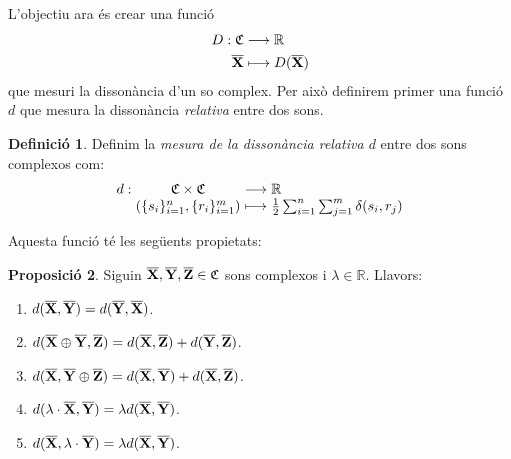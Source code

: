 \documentclass{article}
\theoremstyle{definition}
\newtheorem{definition}{Definició}[section]
\newtheorem{prop}[definition]{Proposició}
\newcommand{\0}{\ensuremath{\vb{0}}}
\newcommand{\X}{\ensuremath{\vb{X}}}
\newcommand{\Y}{\ensuremath{\vb{Y}}}
\newcommand{\Z}{\ensuremath{\vb{Z}}}
\newcommand{\RR}{\ensuremath{\mathbb{R}}} %
\begin{document}
L'objectiu ara és crear una funció 
\begin{align*}
    D:\mathfrak{C}&\longrightarrow\RR\\
    \overline{\X}&\longmapsto D(\overline{\X})
\end{align*}
que mesuri la dissonància d'un so complex. Per això definirem primer una funció $d$ que mesura la dissonància \textit{relativa} entre dos sons.
\begin{definition}
    Definim la \textit{mesura de la dissonància relativa $d$} entre dos sons complexos com:
    \begin{equation*}
        \begin{array}{r@{\hspace{0.5\tabcolsep}}c@{\hspace{0.5\tabcolsep}}c@{\hspace{0.5\tabcolsep}}l}
            d:&\mathfrak{C}\times\mathfrak{C}&\longrightarrow&\RR\\
        &(\{s_i\}_{i=1}^n,\{r_i\}_{i=1}^m)&\longmapsto&\frac{1}{2}\sum_{i=1}^n\sum_{j=1}^m\delta(s_i,r_j)
        \end{array}
    \end{equation*}
\end{definition}
Aquesta funció té les següents propietats:
\begin{prop}
    Siguin $\overline{\X},\overline{\Y},\overline{\Z}\in\mathfrak{C}$ sons complexos i $\lambda\in\RR$. Llavors:
    \begin{enumerate}[label=$d$\arabic*),ref=$d$\arabic*]
        \item\label{d1} $d(\overline{\X},\overline{\Y})=d(\overline{\Y},\overline{\X})$.
        \item\label{d2} $d(\overline{\X}\oplus\overline{\Y},\overline{\Z})=d(\overline{\X},\overline{\Z})+d(\overline{\Y},\overline{\Z})$.
        \item\label{d3} $d(\overline{\X},\overline{\Y}\oplus\overline{\Z})=d(\overline{\X},\overline{\Y})+d(\overline{\X},\overline{\Z})$.
        \item\label{d4} $d(\lambda\cdot\overline{\X},\overline{\Y})=\lambda d(\overline{\X},\overline{\Y})$.
        \item\label{d5} $d(\overline{\X},\lambda\cdot\overline{\Y})=\lambda d(\overline{\X},\overline{\Y})$.
    \end{enumerate}
\end{prop}
\end{document}
